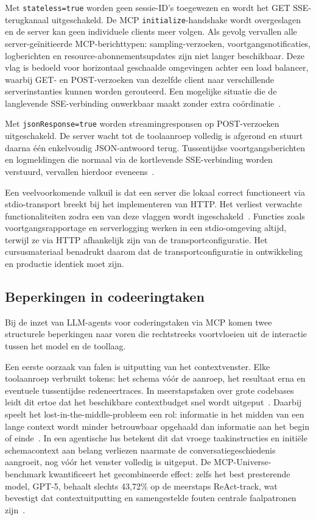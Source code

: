 Met \texttt{stateless=true} worden geen sessie-ID's toegewezen en wordt het GET SSE-terugkanaal uitgeschakeld. De MCP \texttt{initialize}-handshake wordt overgeslagen en de server kan geen individuele clients meer volgen. Als gevolg vervallen alle server-geïnitieerde MCP-berichttypen: sampling-verzoeken, voortgangsnotificaties, logberichten en resource-abonnementsupdates zijn niet langer beschikbaar. Deze vlag is bedoeld voor horizontaal geschaalde omgevingen achter een load balancer, waarbij GET- en POST-verzoeken van dezelfde client naar verschillende serverinstanties kunnen worden gerouteerd. Een mogelijke situatie die de langlevende SSE-verbinding onwerkbaar maakt zonder extra coördinatie~\cite{anthropic2025mcpadvanced}.

Met \texttt{jsonResponse=true} worden streamingresponsen op POST-verzoeken uitgeschakeld. De server wacht tot de toolaanroep volledig is afgerond en stuurt daarna één enkelvoudig JSON-antwoord terug. Tussentijdse voortgangsberichten en logmeldingen die normaal via de kortlevende SSE-verbinding worden verstuurd, vervallen hierdoor eveneens~\cite{anthropic2025mcpadvanced}.

Een veelvoorkomende valkuil is dat een server die lokaal correct functioneert via stdio-transport  breekt bij het implementeren van HTTP. Het verliest verwachte functionaliteiten zodra een van deze vlaggen wordt ingeschakeld~\cite{anthropic2025mcpadvanced}. Functies zoals voortgangsrapportage en serverlogging werken in een stdio-omgeving altijd, terwijl ze via HTTP afhankelijk zijn van de transportconfiguratie. Het cursusmateriaal benadrukt daarom dat de transportconfiguratie in ontwikkeling en productie identiek moet zijn.

\subsection{Beperkingen in codeeringtaken}\label{subsec:coding-limitations}

Bij de inzet van LLM-agents voor coderingstaken via MCP komen twee structurele beperkingen naar voren die rechtstreeks voortvloeien uit de interactie tussen het model en de toollaag.

Een eerste oorzaak van falen is uitputting van het contextvenster. Elke toolaanroep verbruikt tokens: het schema vóór de aanroep, het resultaat erna en eventuele tussentijdse redeneertraces. In meerstapstaken over grote codebases leidt dit ertoe dat het beschikbare contextbudget snel wordt uitgeput~\cite{Fan2025MCPToolBenchPP}. Daarbij speelt het lost-in-the-middle-probleem een rol: informatie in het midden van een lange context wordt minder betrouwbaar opgehaald dan informatie aan het begin of einde~\cite{zhou2025prompt}. In een agentische lus betekent dit dat vroege taakinstructies en initiële schemacontext aan belang verliezen naarmate de conversatiegeschiedenis aangroeit, nog vóór het venster volledig is uitgeput. De MCP-Universe-benchmark kwantificeert het gecombineerde effect: zelfs het best presterende model, GPT-5, behaalt slechts 43,72\% op de meerstaps ReAct-track, wat bevestigt dat contextuitputting en samengestelde fouten centrale faalpatronen zijn~\cite{Luo2025MCPUniverse}.

